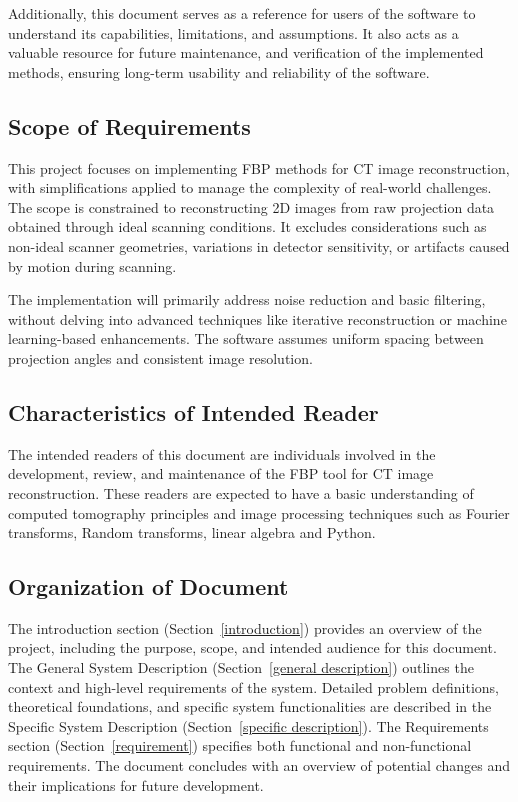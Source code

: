 \documentclass[12pt]{article}
\begin{document}
Additionally, this document serves as a reference for users of the software to
understand its capabilities, limitations, and assumptions. It also acts as a
valuable resource for future maintenance, and verification of the implemented
methods, ensuring long-term usability and reliability of the software.

\subsection{Scope of Requirements}
This project focuses on implementing FBP methods for CT image reconstruction,
with simplifications applied to manage the complexity of real-world challenges.
The scope is constrained to reconstructing 2D images from raw projection data
obtained through ideal scanning conditions. It excludes considerations such as
non-ideal scanner geometries, variations in detector sensitivity, or artifacts
caused by motion during scanning.

The implementation will primarily address noise reduction and basic filtering,
without delving into advanced techniques like iterative reconstruction or
machine learning-based enhancements. The software assumes uniform spacing
between projection angles and consistent image resolution.

\subsection{Characteristics of Intended Reader} \label{sec_IntendedReader}
The intended readers of this document are individuals involved in the development,
review, and maintenance of the FBP tool for CT image reconstruction. These
readers are expected to have a basic understanding of computed tomography
principles and image processing techniques such as Fourier transforms, Random
transforms, linear algebra and Python.

\subsection{Organization of Document}
The introduction section (Section~\ref{introduction}) provides an overview of
the project, including the purpose, scope, and intended audience for this
document. The General System Description (Section~\ref{general description}) outlines
the context and high-level requirements of the system. Detailed problem
definitions, theoretical foundations, and specific system functionalities are
described in the Specific System Description (Section~\ref{specific description}). The
Requirements section (Section~\ref{requirement}) specifies both functional
and non-functional requirements. The document concludes with an overview of
potential changes and their implications for future development.
\end{document}
